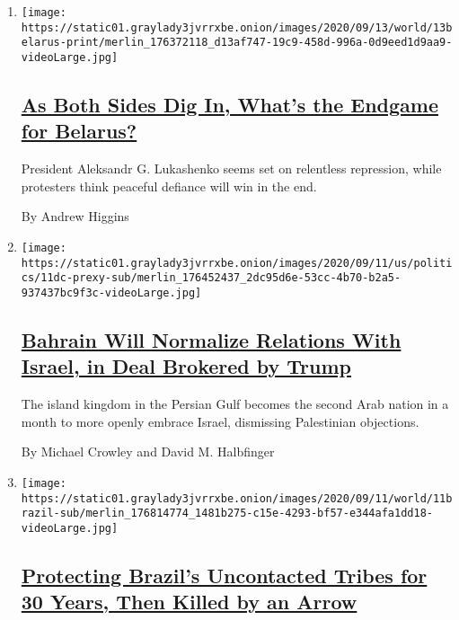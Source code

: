 \begin{enumerate}
\def\labelenumi{\arabic{enumi}.}
\item
  \texttt{[image: https://static01.graylady3jvrrxbe.onion/images/2020/09/13/world/13belarus-print/merlin\_176372118\_d13af747-19c9-458d-996a-0d9eed1d9aa9-videoLarge.jpg]}

  \hypertarget{as-both-sides-dig-in-whats-the-endgame-for-belarus}{%
  \subsection{\texorpdfstring{\href{/2020/09/12/world/europe/belarus-russia-protests-endgame.html}{As
  Both Sides Dig In, What's the Endgame for
  Belarus?}}{As Both Sides Dig In, What's the Endgame for Belarus?}}\label{as-both-sides-dig-in-whats-the-endgame-for-belarus}}

  President Aleksandr G. Lukashenko seems set on relentless repression,
  while protesters think peaceful defiance will win in the end.

  By Andrew Higgins
\item
  \texttt{[image: https://static01.graylady3jvrrxbe.onion/images/2020/09/11/us/politics/11dc-prexy-sub/merlin\_176452437\_2dc95d6e-53cc-4b70-b2a5-937437bc9f3c-videoLarge.jpg]}

  \hypertarget{bahrain-will-normalize-relations-with-israel-in-deal-brokered-by-trump}{%
  \subsection{\texorpdfstring{\href{/2020/09/11/world/middleeast/bahrain-israel-trump.html}{Bahrain
  Will Normalize Relations With Israel, in Deal Brokered by
  Trump}}{Bahrain Will Normalize Relations With Israel, in Deal Brokered by Trump}}\label{bahrain-will-normalize-relations-with-israel-in-deal-brokered-by-trump}}

  The island kingdom in the Persian Gulf becomes the second Arab nation
  in a month to more openly embrace Israel, dismissing Palestinian
  objections.

  By Michael Crowley and David M. Halbfinger
\item
  \texttt{[image: https://static01.graylady3jvrrxbe.onion/images/2020/09/11/world/11brazil-sub/merlin\_176814774\_1481b275-c15e-4293-bf57-e344afa1dd18-videoLarge.jpg]}

  \hypertarget{protecting-brazils-uncontacted-tribes-for-30-years-then-killed-by-an-arrow}{%
  \subsection{\texorpdfstring{\href{/2020/09/11/world/americas/brazil-uncontacted-tribes.html}{Protecting
  Brazil's Uncontacted Tribes for 30 Years, Then Killed by an
  Arrow}}{Protecting Brazil's Uncontacted Tribes for 30 Years, Then Killed by an Arrow}}\label{protecting-brazils-uncontacted-tribes-for-30-years-then-killed-by-an-arrow}}


\end{enumerate}
